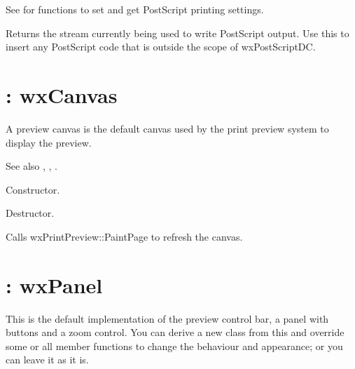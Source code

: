 See  for functions to set and
get PostScript printing settings.



Returns the stream currently being used to write PostScript output. Use this
to insert any PostScript code that is outside the scope of wxPostScriptDC.

\section{: wxCanvas}\label{wxpreviewcanvas}

A preview canvas is the default canvas used by the print preview
system to display the preview.

See also , ,
.



Constructor.



Destructor.



Calls wxPrintPreview::PaintPage to refresh the canvas.

\section{: wxPanel}\label{wxpreviewcontrolbar}

This is the default implementation of the preview control bar, a panel
with buttons and a zoom control. You can derive a new class from this and
override some or all member functions to change the behaviour and appearance;
or you can leave it as it is.

